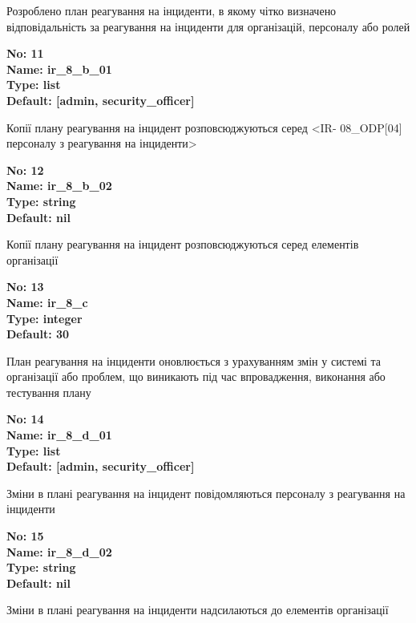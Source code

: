 \documentclass{article}
\begin{document}
{\footnotesize Розроблено план реагування на інциденти, в якому чітко визначено відповідальність за реагування на інциденти для організацій, персоналу або ролей}


{\footnotesize\bfseries
No: 11\\
Name: ir\_\allowbreak{}8\_\allowbreak{}b\_\allowbreak{}01\\
Type: list\\
Default: [\textquotedbl{}admin\textquotedbl{}, \textquotedbl{}security\_\allowbreak{}officer\textquotedbl{}]
}

{\footnotesize Копії плану реагування на інцидент розповсюджуються серед <IR- 08\_\allowbreak{}ODP[04] персоналу з реагування на інциденти>}


{\footnotesize\bfseries
No: 12\\
Name: ir\_\allowbreak{}8\_\allowbreak{}b\_\allowbreak{}02\\
Type: string\\
Default: nil
}

{\footnotesize Копії плану реагування на інцидент розповсюджуються серед елементів організації}


{\footnotesize\bfseries
No: 13\\
Name: ir\_\allowbreak{}8\_\allowbreak{}c\\
Type: integer\\
Default: 30
}

{\footnotesize План реагування на інциденти оновлюється з урахуванням змін у системі та організації або проблем, що виникають під час впровадження, виконання або тестування плану}


{\footnotesize\bfseries
No: 14\\
Name: ir\_\allowbreak{}8\_\allowbreak{}d\_\allowbreak{}01\\
Type: list\\
Default: [\textquotedbl{}admin\textquotedbl{}, \textquotedbl{}security\_\allowbreak{}officer\textquotedbl{}]
}

{\footnotesize Зміни в плані реагування на інцидент повідомляються персоналу з реагування на інциденти}


{\footnotesize\bfseries
No: 15\\
Name: ir\_\allowbreak{}8\_\allowbreak{}d\_\allowbreak{}02\\
Type: string\\
Default: nil
}

{\footnotesize Зміни в плані реагування на інциденти надсилаються до елементів організації}
\end{document}
